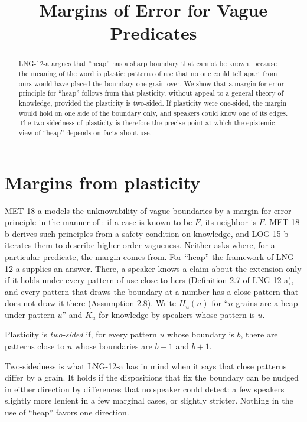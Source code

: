 \documentclass{situationist-preprint}
\title{Margins of Error for Vague Predicates}
\begin{document}
\maketitle

\begin{abstract}
LNG-12-a argues that \enquote{heap} has a sharp boundary that cannot be known, because the meaning of the word is plastic: patterns of use that no one could tell apart from ours would have placed the boundary one grain over. We show that a margin-for-error principle for \enquote{heap} follows from that plasticity, without appeal to a general theory of knowledge, provided the plasticity is two-sided. If plasticity were one-sided, the margin would hold on one side of the boundary only, and speakers could know one of its edges. The two-sidedness of plasticity is therefore the precise point at which the epistemic view of \enquote{heap} depends on facts about use.
\end{abstract}

\section{Margins from plasticity}

MET-18-a models the unknowability of vague boundaries by a margin-for-error principle in the manner of \citet{Williamson1992}: if a case is known to be $F$, its neighbor is $F$. MET-18-b derives such principles from a safety condition on knowledge, and LOG-15-b iterates them to describe higher-order vagueness. Neither asks where, for a particular predicate, the margin comes from. For \enquote{heap} the framework of LNG-12-a supplies an answer. There, a speaker knows a claim about the extension only if it holds under every pattern of use close to hers (Definition 2.7 of LNG-12-a), and every pattern that draws the boundary at a number has a close pattern that does not draw it there (Assumption 2.8). Write $H_u(n)$ for \enquote{$n$ grains are a heap under pattern $u$} and $K_u$ for knowledge by speakers whose pattern is $u$.

\begin{definition}\label{d:two}
Plasticity is \emph{two-sided} if, for every pattern $u$ whose boundary is $b$, there are patterns close to $u$ whose boundaries are $b-1$ and $b+1$.
\end{definition}

Two-sidedness is what LNG-12-a has in mind when it says that close patterns differ by a grain. It holds if the dispositions that fix the boundary can be nudged in either direction by differences that no speaker could detect: a few speakers slightly more lenient in a few marginal cases, or slightly stricter. Nothing in the use of \enquote{heap} favors one direction.
\end{document}
